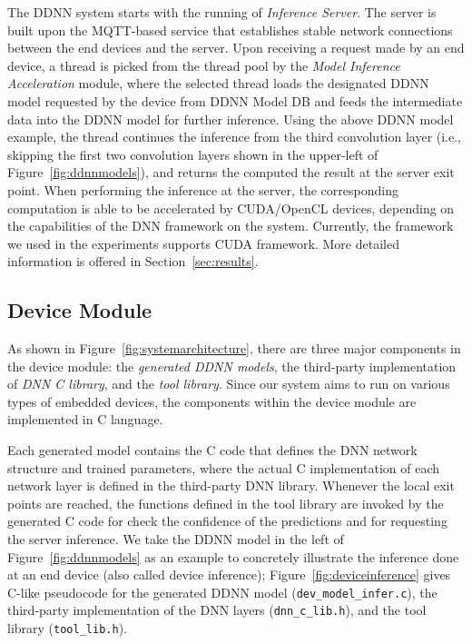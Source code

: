 \documentclass[format=acmsmall, review=false, screen=true]{acmart}
\def\figurename{Figure}
\def\sectionname{Section}
\begin{document}
The DDNN system starts with the running of \emph{Inference Server}. The server is built upon the MQTT-based service \cite{aziz2014formal} that establishes stable network connections between the end devices and the server. Upon receiving a request made by an end device, a thread is picked from the thread pool by the \emph{Model Inference Acceleration} module, where the selected thread loads the designated DDNN model requested by the device from DDNN Model DB and feeds the intermediate data into the DDNN model for further inference. Using the above DDNN model example, the thread continues the inference from the third convolution layer (i.e., skipping the first two convolution layers shown in the upper-left of \figurename~\ref{fig:ddnnmodels}), and returns the computed the result at the server exit point. When performing the inference at the server, the corresponding computation is able to be accelerated by CUDA/OpenCL devices, depending on the capabilities of the DNN framework on the system. Currently, the framework we used in the experiments supports CUDA framework. More detailed information is offered in \sectionname~\ref{sec:results}.


\subsection{Device Module}
\label{sec:devicemodule}
As shown in \figurename~\ref{fig:systemarchitecture}, there are three major components in the device module: the \emph{generated DDNN models}, the third-party implementation of \emph{DNN C library}, and the \emph{tool library}. Since our system aims to run on various types of embedded devices, the components within the device module are implemented in C language.

Each generated model contains the C code that defines the DNN network structure and trained parameters, where the actual C implementation of each network layer is defined in the third-party DNN library. Whenever the local exit points are reached, the functions defined in the tool library are invoked by the generated C code for check the confidence of the predictions and for requesting the server inference. We take the DDNN model in the left of \figurename~\ref{fig:ddnnmodels} as an example to concretely illustrate the inference done at an end device (also called device inference); \figurename~\ref{fig:deviceinference} gives C-like pseudocode for the generated DDNN model (\texttt{dev\_model\_infer.c}), the third-party implementation of the DNN layers (\texttt{dnn\_c\_lib.h}), and the tool library (\texttt{tool\_lib.h}).
\end{document}
